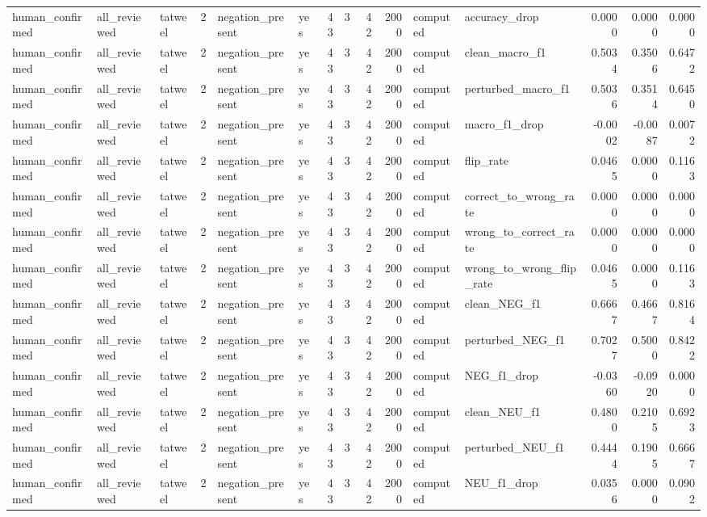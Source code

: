 \begin{tabular}{lllrllrrrrllrrr}
human_confirmed & all_reviewed & tatweel & 2 & negation_present & yes & 43 & 3 & 42 & 2000 & computed & accuracy_drop & 0.0000 & 0.0000 & 0.0000 \\
human_confirmed & all_reviewed & tatweel & 2 & negation_present & yes & 43 & 3 & 42 & 2000 & computed & clean_macro_f1 & 0.5034 & 0.3506 & 0.6472 \\
human_confirmed & all_reviewed & tatweel & 2 & negation_present & yes & 43 & 3 & 42 & 2000 & computed & perturbed_macro_f1 & 0.5036 & 0.3514 & 0.6450 \\
human_confirmed & all_reviewed & tatweel & 2 & negation_present & yes & 43 & 3 & 42 & 2000 & computed & macro_f1_drop & -0.0002 & -0.0087 & 0.0072 \\
human_confirmed & all_reviewed & tatweel & 2 & negation_present & yes & 43 & 3 & 42 & 2000 & computed & flip_rate & 0.0465 & 0.0000 & 0.1163 \\
human_confirmed & all_reviewed & tatweel & 2 & negation_present & yes & 43 & 3 & 42 & 2000 & computed & correct_to_wrong_rate & 0.0000 & 0.0000 & 0.0000 \\
human_confirmed & all_reviewed & tatweel & 2 & negation_present & yes & 43 & 3 & 42 & 2000 & computed & wrong_to_correct_rate & 0.0000 & 0.0000 & 0.0000 \\
human_confirmed & all_reviewed & tatweel & 2 & negation_present & yes & 43 & 3 & 42 & 2000 & computed & wrong_to_wrong_flip_rate & 0.0465 & 0.0000 & 0.1163 \\
human_confirmed & all_reviewed & tatweel & 2 & negation_present & yes & 43 & 3 & 42 & 2000 & computed & clean_NEG_f1 & 0.6667 & 0.4667 & 0.8164 \\
human_confirmed & all_reviewed & tatweel & 2 & negation_present & yes & 43 & 3 & 42 & 2000 & computed & perturbed_NEG_f1 & 0.7027 & 0.5000 & 0.8422 \\
human_confirmed & all_reviewed & tatweel & 2 & negation_present & yes & 43 & 3 & 42 & 2000 & computed & NEG_f1_drop & -0.0360 & -0.0920 & 0.0000 \\
human_confirmed & all_reviewed & tatweel & 2 & negation_present & yes & 43 & 3 & 42 & 2000 & computed & clean_NEU_f1 & 0.4800 & 0.2105 & 0.6923 \\
human_confirmed & all_reviewed & tatweel & 2 & negation_present & yes & 43 & 3 & 42 & 2000 & computed & perturbed_NEU_f1 & 0.4444 & 0.1905 & 0.6667 \\
human_confirmed & all_reviewed & tatweel & 2 & negation_present & yes & 43 & 3 & 42 & 2000 & computed & NEU_f1_drop & 0.0356 & 0.0000 & 0.0902 \\

\end{tabular}

